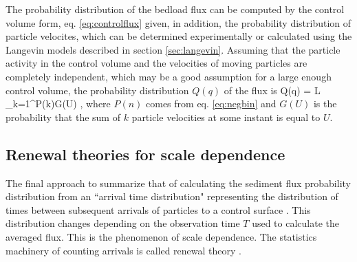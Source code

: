 The probability distribution of the bedload flux can be computed by the control volume form, eq. \ref{eq:controlflux} given, in addition, the probability distribution of particle velocites, which can be determined experimentally \citep{Lajeunesse2012,Fathel2015,Heyman2016} or calculated using the Langevin models described in section \ref{sec:langevin}.
Assuming that the particle activity in the control volume and the velocities of moving particles are completely independent, which may be a good assumption for a large enough control volume, the probability distribution $Q(q)$ of the flux is \citep{Ancey2008,Ancey2014,Ancey2020}
\be Q(q) = L \sum_{k=1}^\infty P(k)G(U) ,\ee
where $P(n)$ comes from eq. \ref{eq:negbin} and $G(U)$ is the probability that the sum of $k$ particle velocities at some instant is equal to $U$.

\subsection{Renewal theories for scale dependence}
\label{sec:renewal}
The final approach to summarize that of calculating the sediment flux probability distribution from an ``arrival time distribution" representing the distribution of times between subsequent arrivals of particles to a control surface \citep{Turowski2010,Ancey2020}. This distribution changes depending on the observation time $T$ used to calculate the averaged flux. This is the phenomenon of scale dependence. The statistics machinery of counting arrivals is called renewal theory \citep{Cox1967}.

